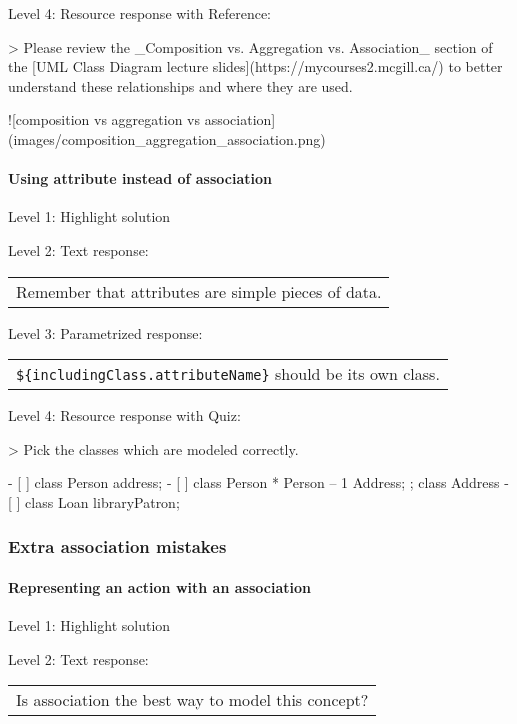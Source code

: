 \noindent Level 4: Resource response with Reference:

> Please review the _Composition vs. Aggregation vs. Association_ section of 
the [UML Class Diagram lecture slides](https://mycourses2.mcgill.ca/) to 
better understand these relationships and where they are used.

![composition vs aggregation vs association](images/composition_aggregation_association.png)


\paragraph{Using attribute instead of association}

\noindent Level 1: Highlight solution \medskip

\noindent Level 2: Text response: \medskip

\begin{tabular}{|c}
Remember that attributes are simple pieces of data.
\end{tabular} \medskip

\noindent Level 3: Parametrized response: \medskip

\begin{tabular}{|c}
\verb|${includingClass.attributeName}| should be its own class.
\end{tabular} \medskip

\noindent Level 4: Resource response with Quiz:

> Pick the classes which are modeled correctly.

- [ ] class Person { address; }
- [ ] class Person { * Person -- 1 Address; }; class Address {}
- [ ] class Loan { libraryPatron; }


\subsubsection{Extra association mistakes}

\paragraph{Representing an action with an association}

\noindent Level 1: Highlight solution \medskip

\noindent Level 2: Text response: \medskip

\begin{tabular}{|c}
Is association the best way to model this concept?
\end{tabular} \medskip

